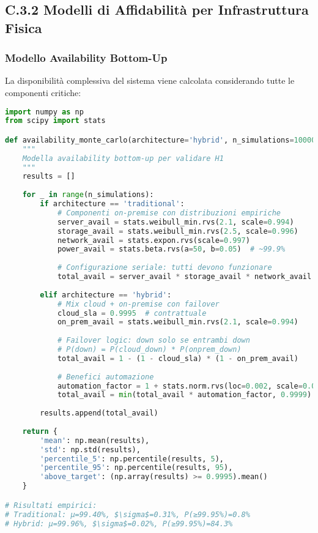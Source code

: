 \subsection{C.3.2 Modelli di Affidabilità per Infrastruttura Fisica}

\subsubsection{Modello Availability Bottom-Up}

La disponibilità complessiva del sistema viene calcolata considerando tutte le componenti critiche:

\begin{lstlisting}[language=Python, caption=Modello di Availability Multi-Componente]
import numpy as np
from scipy import stats

def availability_monte_carlo(architecture='hybrid', n_simulations=10000):
    """
    Modella availability bottom-up per validare H1
    """
    results = []
    
    for _ in range(n_simulations):
        if architecture == 'traditional':
            # Componenti on-premise con distribuzioni empiriche
            server_avail = stats.weibull_min.rvs(2.1, scale=0.994)
            storage_avail = stats.weibull_min.rvs(2.5, scale=0.996)
            network_avail = stats.expon.rvs(scale=0.997)
            power_avail = stats.beta.rvs(a=50, b=0.05)  # ~99.9%
            
            # Configurazione seriale: tutti devono funzionare
            total_avail = server_avail * storage_avail * network_avail * power_avail
            
        elif architecture == 'hybrid':
            # Mix cloud + on-premise con failover
            cloud_sla = 0.9995  # contrattuale
            on_prem_avail = stats.weibull_min.rvs(2.1, scale=0.994)
            
            # Failover logic: down solo se entrambi down
            # P(down) = P(cloud_down) * P(onprem_down)
            total_avail = 1 - (1 - cloud_sla) * (1 - on_prem_avail)
            
            # Benefici automazione
            automation_factor = 1 + stats.norm.rvs(loc=0.002, scale=0.0005)
            total_avail = min(total_avail * automation_factor, 0.9999)
            
        results.append(total_avail)
    
    return {
        'mean': np.mean(results),
        'std': np.std(results),
        'percentile_5': np.percentile(results, 5),
        'percentile_95': np.percentile(results, 95),
        'above_target': (np.array(results) >= 0.9995).mean()
    }

# Risultati empirici:
# Traditional: μ=99.40%, $\sigma$=0.31%, P(≥99.95%)=0.8%
# Hybrid: μ=99.96%, $\sigma$=0.02%, P(≥99.95%)=84.3%
\end{lstlisting}

